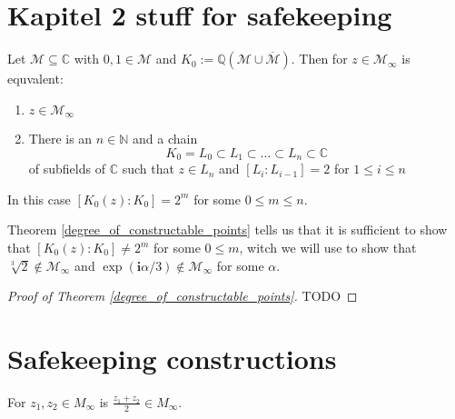 \section{Kapitel 2 stuff for safekeeping}

\begin{theorem}
\label{degree_of_constructable_points}
    Let $\mathcal{M}\subseteq\mathbb{C}$ with $0,1 \in \mathcal{M}$ and $K_0 := \mathbb{Q}(\mathcal{M}\cup \overline{\mathcal{M}})$.
    Then for $z \in \mathcal{M}_{\infty}$ is equvalent:
    \begin{enumerate}
        \item $z \in \mathcal{M}_{\infty}$
        \item There is an $n \in \mathbb{N}$ and a chain \begin{equation*}
            K_0 = L_0 \subset L_1 \subset \dots \subset L_n \subset \mathbb{C}
        \end{equation*}
        of subfields of $\mathbb{C}$ such that $z \in L_n$ and $[L_i:L_{i-1}] =2$ for $1\le i\le n$ %
    \end{enumerate}
    In this case $[K_0(z):K_0] = 2^m$ for some $0 \le m \le n$.
\end{theorem}
\begin{remark}
    Theorem \ref{degree_of_constructable_points} tells us that it is sufficient to show that $[K_0(z):K_0] \ne 2^m$ for some $0 \le m $, witch we will use to show that $\sqrt[3]{2} \notin \mathcal{M}_{\infty}$ and $\exp(\textbf{i} \alpha/3) \notin \mathcal{M}_{\infty}$ for some $\alpha$.
\end{remark}
\begin{proof}[Proof of Theorem \ref{degree_of_constructable_points}]
    TODO %
\end{proof}

\section{Safekeeping constructions}

\begin{lemma}
    \label{construction_midpoint}
    For $z_1, z_2 \in M_{\infty}$ is $\frac{z_1 + z_2}{2} \in M_{\infty}$.
\end{lemma}

